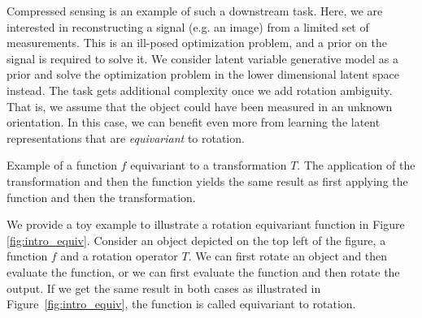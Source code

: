 Compressed sensing is an example of such a downstream task. Here, we are interested in reconstructing a signal (e.g. an image) from a limited set of measurements. 
This is an ill-posed optimization problem, and a prior on the signal is required to solve it. 
We consider latent variable generative model as a prior and solve the optimization problem in the lower dimensional latent space instead. 
The task gets additional complexity once we add rotation ambiguity. 
That is, we assume that the object could have been measured in an unknown orientation. 
In this case, we can benefit even more from learning the latent representations that are \textit{equivariant} to rotation. 
\begin{marginfigure}[-15\baselineskip]
\caption{Example of a function $f$ equivariant to a transformation $T$. The application of the transformation and then the function yields the same result as first applying the function and then the transformation.}
\label{fig:intro_equiv}
\end{marginfigure}

We provide a toy example to illustrate a rotation equivariant function in Figure \ref{fig:intro_equiv}. Consider an object depicted on the top left of the figure, a function $f$ and a rotation operator $T$.
We can first rotate an object and then evaluate the function, or we can first evaluate the function and then rotate the output. 
If we get the same result in both cases as illustrated in Figure~\ref{fig:intro_equiv}, the function is called equivariant to rotation. 

